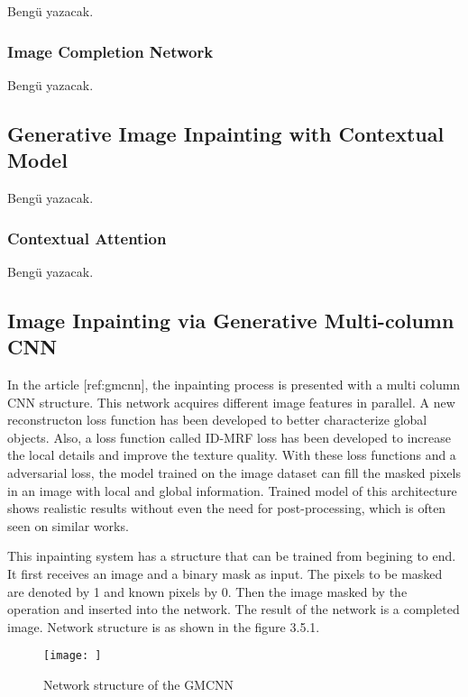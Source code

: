 Bengü yazacak.

\subsubsection{Image Completion Network}

Bengü yazacak.

\subsection{Generative Image Inpainting with Contextual Model}

Bengü yazacak.

\subsubsection{Contextual Attention}

Bengü yazacak.

\subsection{Image Inpainting via Generative Multi-column CNN}

In the article [ref:gmcnn], the inpainting process is presented with a multi column CNN structure. This network acquires different image features in parallel. A new reconstructon loss function has been developed to better characterize global objects. Also, a loss function called ID-MRF loss has been developed to increase the local details and improve the texture quality. With these loss functions and a adversarial loss, the model trained on the image dataset can fill the masked pixels in an image with local and global information. Trained model of this architecture shows realistic results without even the need for post-processing, which is often seen on similar works.

This inpainting system has a structure that can be trained from begining to end. It first receives an image and a binary mask as input. The pixels to be masked are denoted by 1 and known pixels by 0. Then the image masked by the  operation and inserted into the network. The result of the network is a completed image. Network structure is as shown in the figure 3.5.1.

\begin{figure}[h]
    \centering
    \texttt{[image: ]}
    \caption{Network structure of the GMCNN}
    \label{fig:my_label}
\end{figure}


